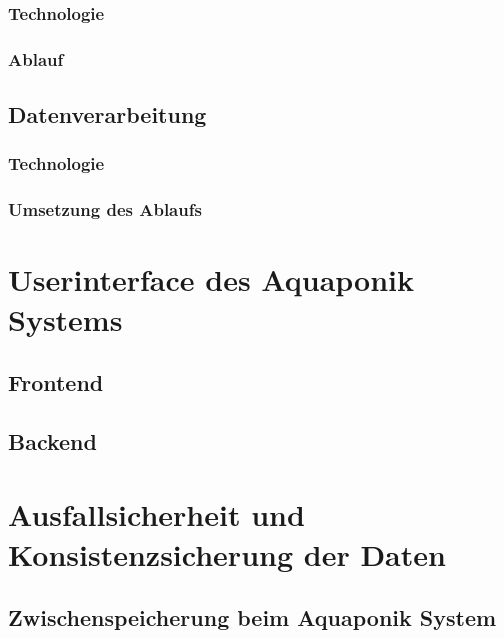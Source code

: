\documentclass[12pt]{article}
\begin{document}
\subsubsection{Technologie}
%

\subsubsection{Ablauf}
%

\subsection{Datenverarbeitung}
%

\subsubsection{Technologie}
%

\subsubsection{Umsetzung des Ablaufs}
%


\newpage %
\section{Userinterface des Aquaponik Systems}
%

\subsection{Frontend}
%

\subsection{Backend}
%

\newpage %
\section{Ausfallsicherheit und Konsistenzsicherung der Daten}
%

\subsection{Zwischenspeicherung beim Aquaponik System}
%
\end{document}
